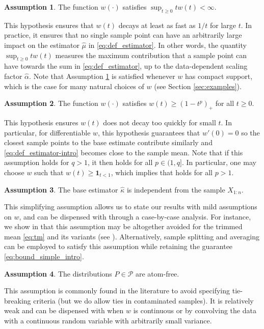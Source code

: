 \documentclass{article}
\theoremstyle{plain}
\theoremstyle{definition}
\newtheorem{assumption}{Assumption}
\def\sP{\mathcal{P}}\def\sQ{\mathcal{Q}}\def\sR{\mathcal{R}}
\begin{document}
\begin{assumption}\label{assum:malpha_finite}
	The function $w(\cdot)$ satisfies $\sup_{t\geq0}tw(t)<\infty$.
\end{assumption}
This hypothesis ensures that $w(t)$ decays at least as fast as $1/t$ for large $t$. In practice, it ensures that no single sample point can have an arbitrarily large impact on the estimator \( \widehat{\mu }  \) in \eqref{eq:def_estimator}.
In other words, the quantity \( \sup_{t\ge 0}t w(t) \) measures the maximum contribution that a sample point can have towards the sum in \eqref{eq:def_estimator}, up to the data-dependent scaling factor \( \widehat{\alpha }  \). Note that Assumption \ref{assum:malpha_finite} is satisfied whenever $w$ has compact support, which is the case for many natural choices of $w$ (see Section \ref{sec:examples}).


\begin{assumption}\label{assum:rho_bound}
	The function $w(\cdot)$ satisfies $w(t)\geq (1-t^p)_+$ for all $t\geq0$.
\end{assumption}
This hypothesis ensures $w(t)$ does not decay too quickly for small $t$. 
In particular, for differentiable $w$, this hypothesis guarantees that $w'(0)=0$ so the closest sample points to the base estimate contribute similarly and \eqref{eq:def_estimator-intro} becomes close to the sample mean. Note that if this assumption holds for \( q>1 \), it then holds for all \( p \in (1,q] \). In particular, one may choose \( w  \) such that \( w(t)\ge \mathbf{1}_{t<1} \), which implies that  holds for all \( p>1 \).

\begin{assumption}\label{assum:kappa_independent}
	The base estimator \( \widehat{\kappa }  \) is independent from the sample \( X_{1:n} \).
\end{assumption}
This simplifying assumption allows us to state our results with mild assumptions on \( w \), and can be dispensed with through a case-by-case analysis. For instance, we show in  that this assumption may be altogether avoided for the trimmed mean \eqref{eq:tm} and its variants (see ). Alternatively, sample splitting and averaging can be employed to satisfy this assumption while retaining the guarantee \eqref{eq:bound_simple_intro}.


\begin{assumption}\label{assum:no_point_mass}
	The distributions $P\in\sP$ are atom-free.
\end{assumption}
This assumption is commonly found in the literature to avoid specifying tie-breaking criteria (but we do allow ties in contaminated samples). 
It is relatively weak and can be dispensed with when $w$ is continuous or by convolving the data with a continuous random variable with arbitrarily small variance.
\end{document}
